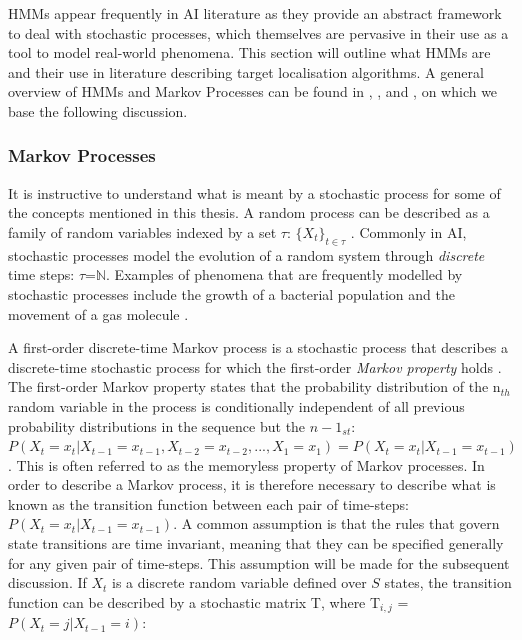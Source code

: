      
HMMs appear frequently in AI literature as they provide an abstract framework to deal with stochastic processes, which themselves are pervasive in their use as a tool to model real-world phenomena. This section will outline what HMMs are and their use in literature describing target localisation algorithms. A general overview of HMMs and Markov Processes can be found in \cite{Murphy1994DynamicLearning}, \cite{Ghahramani2001AnNetworks}, \cite{Bhattacharya2009StochasticApplications} and \cite{papoulis02}, on which we base the following discussion.

\subsubsection{Markov Processes}\label{subsubsec:MarkovProcesses}
It is instructive to understand what is meant by a stochastic process for some of the concepts mentioned in this thesis. A random process can be described as a family of random variables indexed by a set $\tau$: $\{X_t\}_{t\in\tau}$ \cite{Bhattacharya2009StochasticApplications}. Commonly in AI, stochastic processes model the evolution of a random system through \textit{discrete} time steps: $\tau$=$\mathbb N$. Examples of phenomena that are frequently modelled by stochastic processes include the growth of a bacterial population and the movement of a gas molecule \cite{Bhattacharya2009StochasticApplications}.\par

A first-order discrete-time Markov process is a stochastic process that describes a discrete-time stochastic process for which the first-order \textit{Markov property} holds \cite{Ghahramani2001AnNetworks}. The first-order Markov property states that the probability distribution of the n$_{th}$ random variable in the process is conditionally independent of all previous probability distributions in the sequence but the $n-1_{st}$: $P(X_t = x_t | X_{t-1} = x_{t-1}, X_{t-2} = x_{t-2}, ... , X_{1} = x_{1}) = P(X_t = x_t | X_{t-1} = x_{t-1})$ \cite{Ghahramani2001AnNetworks}. This is often referred to as the memoryless property of Markov processes. In order to describe a Markov process, it is therefore necessary to describe what is known as the transition function between each pair of time-steps: $P(X_t = x_t | X_{t-1} = x_{t-1})$. A common assumption is that the rules that govern state transitions are time invariant, meaning that they can be specified generally for any given pair of time-steps. This assumption will be made for the subsequent discussion. If $X_t$ is a discrete random variable defined over $S$ states, the transition function can be described by a stochastic matrix T, where T$_{i,j}$ = $P(X_t = j | X_{t-1} = i)$: 

